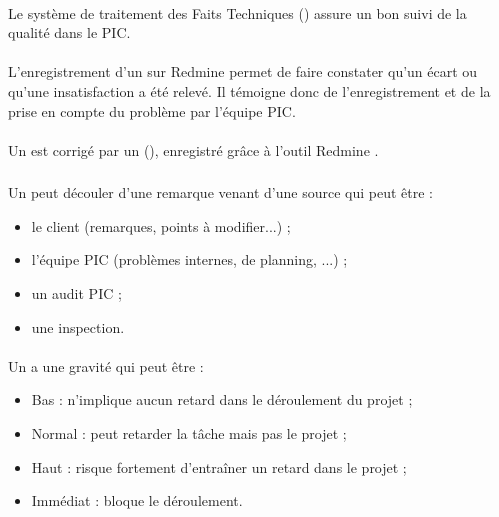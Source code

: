 \paragraph*{} Le système de traitement des Faits Techniques (\FTCourt) assure un bon suivi de la qualité dans
le PIC.

\paragraph*{} L'enregistrement d'un \FT{} sur Redmine permet de faire constater qu'un écart ou
qu'une insatisfaction a été relevé. Il témoigne donc de l'enregistrement et de la prise en compte
du problème par l'équipe PIC.

\paragraph*{} Un \FTCourt{} est corrigé par un \OC{} (\OCCourt), enregistré grâce à l'outil
Redmine .

\subsubsection*{\FT}
\paragraph*{} Un \FT{} peut découler d'une remarque venant d'une source qui peut être :

\begin{itemize}
	\item le client (remarques, points à modifier...) ;
	\item l'équipe PIC (problèmes internes, de planning, ...) ;
	\item un audit PIC ;
	\item une inspection.
\end{itemize}

\paragraph*{} Un \FTCourt{} a une gravité qui peut être :
\begin{itemize}
\item Bas : n'implique aucun retard dans le déroulement du projet ;
\item Normal : peut retarder la tâche mais pas le projet ;
\item Haut : risque fortement d'entraîner un retard dans le projet ;
\item Immédiat : bloque le déroulement.
\end{itemize}

